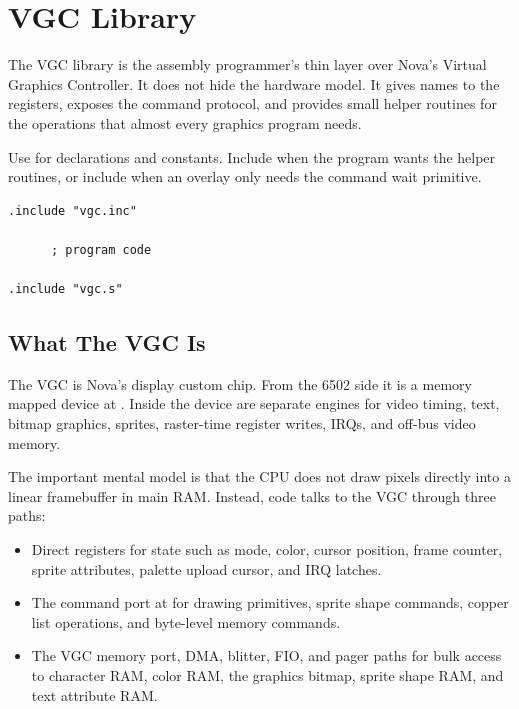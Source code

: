 \chapter{VGC Library}

The VGC library is the assembly programmer's thin layer over Nova's Virtual
Graphics Controller. It does not hide the hardware model. It gives names to the
registers, exposes the command protocol, and provides small helper routines for
the operations that almost every graphics program needs.

\begin{novanote}
Use  for declarations and constants. Include
 when the program wants the helper routines, or include
 when an overlay only needs the command wait primitive.
\end{novanote}

\begin{lstlisting}
.include "vgc.inc"

      ; program code

.include "vgc.s"
\end{lstlisting}

\section{What The VGC Is}

The VGC is Nova's display custom chip. From the 6502 side it is a memory mapped
device at . Inside the device are separate engines for
video timing, text, bitmap graphics, sprites, raster-time register writes, IRQs,
and off-bus video memory.

\begin{center}
\end{center}

The important mental model is that the CPU does not draw pixels directly into a
linear framebuffer in main RAM. Instead, code talks to the VGC through three
paths:

\begin{itemize}
\item Direct registers for state such as mode, color, cursor position, frame
      counter, sprite attributes, palette upload cursor, and IRQ latches.
\item The command port at  for drawing primitives,
      sprite shape commands, copper list operations, and byte-level memory
      commands.
\item The VGC memory port, DMA, blitter, FIO, and pager paths for bulk access to
      character RAM, color RAM, the graphics bitmap, sprite shape RAM, and text
      attribute RAM.
\end{itemize}

